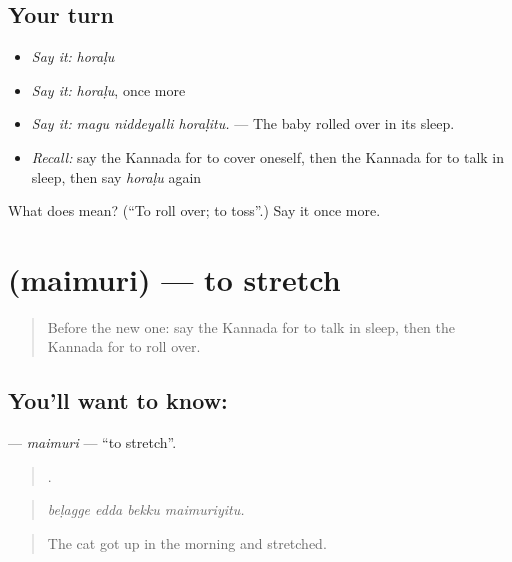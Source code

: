 \subsection*{Your turn}
\begin{itemize}
\raggedright
  \item \emph{Say it:} \emph{horaḷu}
  \item \emph{Say it:} \emph{horaḷu}, once more
  \item \emph{Say it:} \emph{magu niddeyalli horaḷitu.} — The baby rolled over in its sleep.
  \item \emph{Recall:} say the Kannada for to cover oneself, then the Kannada for to talk in sleep, then say \emph{horaḷu} again
\end{itemize}

\begin{tcolorbox}[breakable,colback=teal!4,colframe=teal!35!black,title={Before you move on}]
What does  mean? (\textquotedblleft{}To roll over; to toss\textquotedblright{}.) Say it once more.
\end{tcolorbox}
\section[\texorpdfstring{\kn{ಮೈಮುರಿ} (maimuri)}{ಮೈಮುರಿ (maimuri)}]{ (maimuri) — to stretch}

\label{lesson:KA-C506-maimuri}



\begin{quote}
Before the new one: say the Kannada for to talk in sleep, then the Kannada for to roll over.
\end{quote}

\subsection*{You'll want to know: }
\textbf{} — \emph{maimuri} — \textquotedblleft{}to stretch\textquotedblright{}.

\begin{quote}
   .
\end{quote}

\begin{quote}
\emph{beḷagge edda bekku maimuriyitu.}
\end{quote}

\begin{quote}
The cat got up in the morning and stretched.
\end{quote}

